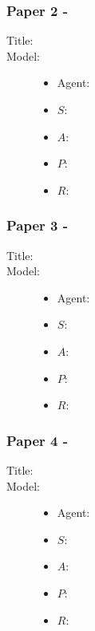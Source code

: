 \documentclass{beamer}
\begin{document}
\begin{frame}
    \frametitle{Paper 2 - }
    \begin{description}
        \item[Title:] \footfullcite{}
        \item[Model:]
        \begin{itemize}
            \item Agent: 
            \item $S$: 
            \item $A$: 
            \item $P$: 
            \item $R$: 
        \end{itemize}
        \item[] 
    \end{description}
\end{frame}

\begin{frame}
    \frametitle{Paper 3 - }
    \begin{description}
        \item[Title:] \footfullcite{}
        \item[Model:]
        \begin{itemize}
            \item Agent: 
            \item $S$: 
            \item $A$: 
            \item $P$: 
            \item $R$: 
        \end{itemize}
        \item[] 
    \end{description}
\end{frame}

\begin{frame}
    \frametitle{Paper 4 - }
    \begin{description}
        \item[Title:] \footfullcite{}
        \item[Model:]
        \begin{itemize}
            \item Agent: 
            \item $S$: 
            \item $A$: 
            \item $P$: 
            \item $R$: 
        \end{itemize}
        \item[] 
    \end{description}
\end{frame}
\end{document}

